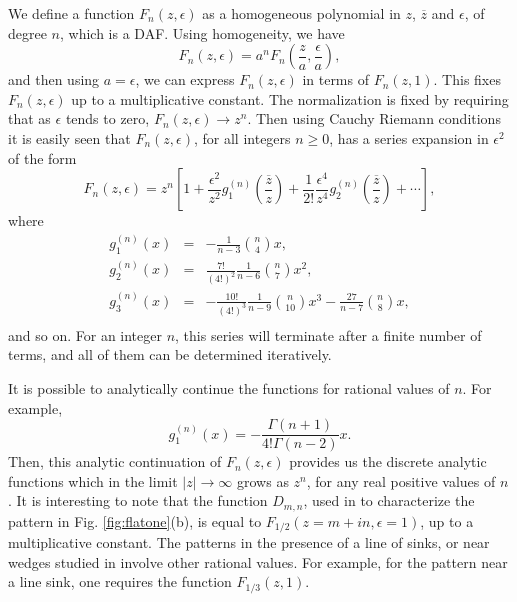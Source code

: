\documentclass[11pt,a4paper]{book}
\begin{document}
We define a function $F_{n}(z,\epsilon)$ as a homogeneous polynomial in
$z$, $\overline{z}$ and $\epsilon$, of degree $n$, which is a DAF. Using homogeneity, we have
\begin{equation}
F_n(z,\epsilon)=a^n F_n(\frac{z}{a},\frac{\epsilon}{a}),
\end{equation}
and then using $a=\epsilon$, we can express $F_n(z,\epsilon)$ in terms
of $F_n(z,1)$.
This fixes $F_{n}(z,\epsilon)$ up to a multiplicative constant. The
normalization is fixed by requiring that as $\epsilon$ tends to zero,
$F_{n}\left( z, \epsilon \right)\rightarrow z^{n}$.
Then using Cauchy Riemann conditions it is easily seen that
$F_{n}(z, \epsilon)$, for all integers $n\ge0$, has a series expansion in
$\epsilon^{2}$ of the form
\begin{equation}
F_{n}(z,\epsilon)=z^{n}\left[ 1+
\frac{\epsilon^{2}}{z^{2}}g_{1}^{(n)}(\frac{\overline{z}}{z})+\frac{1}{2!}
\frac{\epsilon^{4}}{z^{4}}g_{2}^{(n)}(\frac{\overline{z}}{z})+\cdots
\right],
\end{equation}
where
\begin{eqnarray}
g_{1}^{(n)}(x)&=&-\frac{1}{n-3}\binom{n}{4} x,\\
g_{2}^{(n)}(x)&=&\frac{7!}{(4!)^{2}}\frac{1}{n-6}\binom{n}{7}x^{2}, \\
g_{3}^{(n)}(x)&=&-\frac{10!}{(4!)^{3}}\frac{1}{n-9}\binom{n}{10}x^{3}-\frac{27}{n-7}\binom{n}{8}x,\nonumber\\
\end{eqnarray}
and so on. For an integer $n$, this series will terminate after a
finite number of terms, and all of them can be determined
iteratively.

It is possible to analytically continue the functions for
rational values of $n$. For example,
\begin{equation}
g_{1}^{(n)}(x)=-\frac{\Gamma(n+1)}{4!\Gamma(n-2)}x.
\end{equation}
Then, this analytic continuation of $F_{n}(z,\epsilon)$ provides us the discrete
analytic functions which in the limit $|z|\rightarrow \infty$ grows as
$z^{n}$, for any real positive values of $n$. It is interesting to
note that  the function $D_{m,n}$, used in \cite{myepl} to characterize
the pattern in Fig. \ref{fig:flatone}(b), is equal to
$F_{1/2}(z=m+in,\epsilon=1)$, up to a multiplicative constant. The patterns in the presence of a line
of sinks, or near wedges studied in \cite{myjsp} involve other rational
values. For example, for the pattern near a line sink, one requires
the function $F_{1/3}(z,1)$.
\end{document}

